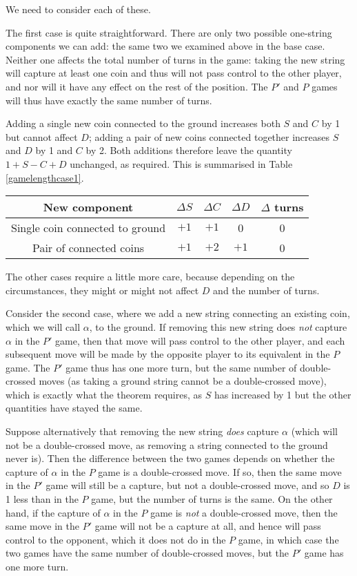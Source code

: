 \documentclass[a4paper,twocolumn]{article}
\begin{document}
We need to consider each of these.

The first case is quite straightforward. There are only two possible
one-string components we can add: the same two we examined above in
the base case. Neither one affects the total number of turns in the
game: taking the new string will capture at least one coin and thus
will not pass control to the other player, and nor will it have any
effect on the rest of the position. The $P'$ and $P$ games will thus
have exactly the same number of turns.

Adding a single new coin connected to the ground increases both $S$
and $C$ by 1 but cannot affect $D$; adding a pair of new coins
connected together increases $S$ and $D$ by 1 and $C$ by 2. Both
additions therefore leave the quantity $1+S-C+D$ unchanged, as
required. This is summarised in Table \ref{gamelengthcase1}.

\begin{table*}[p]
  \centering
  \begin{tabular}{c c c c c}
    New component & $\Delta S$ & $\Delta C$ & $\Delta D$ & $\Delta$
    turns \\
    \hline
    Single coin connected to ground & $+1$ & $+1$ & 0 & 0 \\
    Pair of connected coins & $+1$ & $+2$ & $+1$ & 0
  \end{tabular}
  \caption{New independent component with a single string}
  \label{gamelengthcase1}
\end{table*}

The other cases require a little more care, because depending on the
circumstances, they might or might not affect $D$ and the number of
turns.

Consider the second case, where we add a new string connecting an
existing coin, which we will call $\alpha$, to the ground. If removing
this new string does \emph{not} capture $\alpha$ in the $P'$ game,
then that move will pass control to the other player, and each
subsequent move will be made by the opposite player to its equivalent
in the $P$ game. The $P'$ game thus has one more turn, but the same
number of double-crossed moves (as taking a ground string cannot be a
double-crossed move), which is exactly what the theorem requires, as
$S$ has increased by 1 but the other quantities have stayed the same.

Suppose alternatively that removing the new string \emph{does} capture
$\alpha$ (which will not be a double-crossed move, as removing a
string connected to the ground never is). Then the difference between
the two games depends on whether the capture of $\alpha$ in the $P$
game is a double-crossed move. If so, then the same move in the $P'$
game will still be a capture, but not a double-crossed move, and so
$D$ is 1 less than in the $P$ game, but the number of turns is the
same. On the other hand, if the capture of $\alpha$ in the $P$ game is
\emph{not} a double-crossed move, then the same move in the $P'$ game
will not be a capture at all, and hence will pass control to the
opponent, which it does not do in the $P$ game, in which case the two
games have the same number of double-crossed moves, but the $P'$ game
has one more turn.
\end{document}
